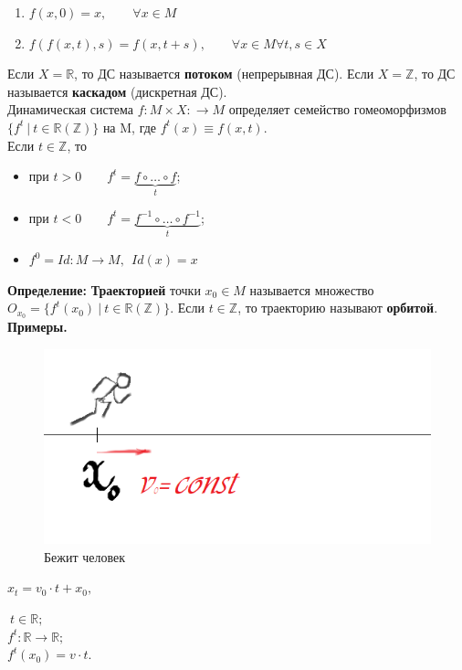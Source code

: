 \documentclass[12pt,a4paper]{article}
\begin{document}
\begin{enumerate}
\item $f(x,0) = x,\qquad \forall x \in M$
\item $f(f(x,t),s) = f(x, t+s),\qquad \forall x \in M \forall t,s \in X$ 
\end{enumerate} 

Если $X = \mathbb{R}$, то ДС называется \textbf{потоком} (непрерывная ДС).
Если $X = \mathbb{Z}$, то ДС называется \textbf{каскадом} (дискретная ДС).\\

Динамическая система $f:M\times X: \rightarrow M$ определяет семейство гомеоморфизмов $\{ f^t~|~ t \in \mathbb{R}(\mathbb{Z}) \}$ на M, где $f^t(x) \equiv f(x,t)$. \\

Если $t \in \mathbb{Z}$, то
\begin{itemize}
\item при $t > 0 \qquad f^t = \underbrace{f \circ \ldots \circ f}_t$;
\item при $t < 0 \qquad f^t = \underbrace{f^{-1} \circ \ldots \circ f^{-1}}_t$;
\item $f^0 = Id:M \rightarrow M, ~~ Id(x) = x$
\end{itemize}

\textbf{\large{Определение:}} \textbf{Траекторией} точки $x_0 \in M$ называется множество $O_{x_0} = \{f^t(x_0)~|~ t \in \mathbb{R(\mathbb{Z})} \}$. Если $t \in \mathbb{Z}$, то траекторию называют \textbf{орбитой}.\\

\textbf{Примеры.} 


\begin{figure}
\includegraphics[scale = 0.45]{runner.png} 
\caption{Бежит человек}
\end{figure}


$x_t = v_0\cdot t + x_0,$

$~ t\in \mathbb{R};$\\

$f^t:\mathbb{R} \rightarrow \mathbb{R};$\\

$f^t(x_0) = v\cdot t.$
\end{document}
